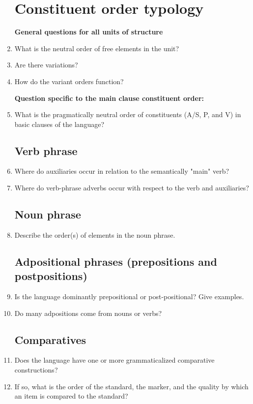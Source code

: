 \documentclass[twocolumn]{scrartcl}
\begin{document}
\begin{enumerate}[resume]
\section{Constituent order typology}
\textbf{General questions for all units of structure}
\item What is the neutral order of free elements in the unit?
\item Are there variations?
\item How do the variant orders function?

\textbf{Question specific to the main clause constituent order:}
\item What is the pragmatically neutral order of constituents (A/S, P, and V) in basic clauses of the language?
\subsection{Verb phrase}
\item Where do auxiliaries occur in relation to the semantically "main" verb?
\item Where do verb-phrase adverbs occur with respect to the verb and auxiliaries?
\subsection{Noun phrase}
\item Describe the order(s) of elements in the noun phrase.
\subsection{Adpositional phrases (prepositions and postpositions)}
\item Is the language dominantly prepositional or post-positional?  Give examples.
\item Do many adpositions come from nouns or verbs?
\subsection{Comparatives}
\item Does the language have one or more grammaticalized comparative constructions?
\item If so, what is the order of the standard, the marker, and the quality by which an item is compared to the standard?
\end{enumerate}
\end{document}
